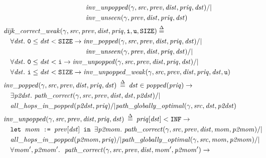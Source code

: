 \begin{equation*}
\begin{split}
&\hspace{11em}\m{inv\_unpopped}(\gamma, \m{src}, \m{prev}, \m{dist}, \m{priq}, \m{dst}) /| \null \\
&\hspace{11em}\m{inv\_unseen}(\gamma, \m{prev}, \m{dist}, \m{priq}, \m{dst}) \\
\vspace{1em}
&\!\!\!\!\!\!\m{dijk\_correct\_weak}(\gamma, \m{src}, \m{prev}, \m{dist}, \m{priq}, \texttt{i}, \texttt{u}, \texttt{SIZE}) \; \defeq \; \\
&\forall \m{dst}.~\texttt{0} \le \m{dst} < \texttt{SIZE} -> \m{inv\_popped}(\gamma, \m{src}, \m{prev}, \m{dist}, \m{priq}, \m{dst}) /| \null \\
&\hspace{11em}\m{inv\_unseen}(\gamma, \m{prev}, \m{dist}, \m{priq}, \m{dst}) /| \null \\
&\forall \m{dst}.~\texttt{0} \le \m{dst} < \texttt{i} -> \m{inv\_unpopped}(\gamma, \m{src}, \m{prev}, \m{dist}, \m{priq}, \m{dst}) /| \null \\
&\forall \m{dst}.~\texttt{i} \le \m{dst} < \texttt{SIZE} -> \m{inv\_unpopped\_weak}(\gamma, \m{src}, \m{prev}, \m{dist}, \m{priq}, \m{dst}, \texttt{u}) \\
\vspace{1em}
&\!\!\!\!\!\!\m{inv\_popped}(\gamma, \m{src}, \m{prev}, \m{dist}, \m{priq}, \m{dst}) \; \defeq \; \m{dst} \in \m{popped}(\m{priq}) -> \\
&\exists \m{p2dst}.~\m{path\_correct}(\gamma, \m{src}, \m{prev}, \m{dist}, \m{dst}, \m{p2dst}) /| \null \\
&\m{all\_hops\_in\_popped}(\m{p2dst}, \m{priq}) /|
\m{path\_globally\_optimal}(\gamma, \m{src}, \m{dst}, \m{p2dst}) \\
\vspace{1em}
&\!\!\!\!\!\!\m{inv\_unpopped}(\gamma, \m{src}, \m{prev}, \m{dist}, \m{priq}, \m{dst}) \; \defeq \; \m{priq}[\m{dst}] < \texttt{INF} -> \\
&\texttt{let } \m{mom} \texttt{ := } \m{prev}[\m{dst}] \texttt{ in } \exists \m{p2mom}.~\m{path\_correct}(\gamma, \m{src}, \m{prev}, \m{dist}, \m{mom}, \m{p2mom}) /| \null \\
&\m{all\_hops\_in\_popped}(\m{p2mom}, \m{priq}) /| \m{path\_globally\_optimal}(\gamma, \m{src}, \m{mom}, \m{p2mom}) /| \null \\
&\forall \m{mom', p2mom'}.~~\m{path\_correct}(\gamma, \m{src}, \m{prev}, \m{dist}, \m{mom'}, \m{p2mom'}) -> \\

\end{split}
\end{equation*}
